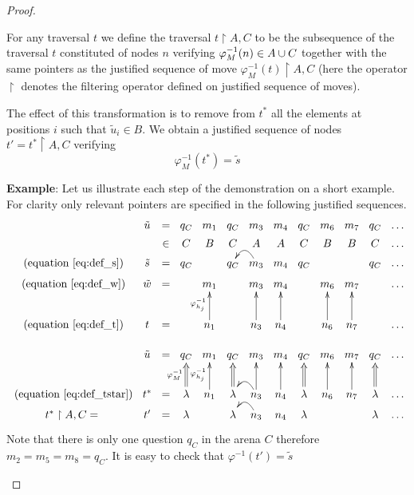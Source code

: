 \begin{proof}
\begin{itemize}
        For any traversal $t$ we define the traversal $t \upharpoonright A,C$
        to be the subsequence of the traversal $t$ constituted of nodes $n$
        verifying $\varphi^{-1}_M(n) \in A \cup C$ together with the same
        pointers as the justified sequence of move $\varphi^{-1}_M(t) \upharpoonright A,C$ (here the
        operator $\upharpoonright$ denotes the filtering operator
        defined on justified sequence of moves).

        The effect of this transformation is to  remove from $t^\ast$ all the elements at positions $i$ such that $\tilde{u}_i \in B$.
        We obtain a justified sequence of nodes $t' = t^\ast \upharpoonright A,C$
        verifying
            $$\varphi^{-1}_{M}(t^\ast) = \tilde{s}$$


        \textbf{Example}: Let us illustrate each step of the demonstration on a short example.
         For clarity only relevant pointers are specified in the following justified sequences.
        $$
        \xymatrix @=3pt{
          & \tilde{u} &=& q_C & m_1 & q_C & m_3 & m_4 & q_C & m_6 & m_7 & q_C & \ldots \\
          & &\in& C & B & C & A & A & C & B & B & C & \ldots \\
          \mbox{ (equation \ref{eq:def_s})} & \tilde{s} &=& q_C & & q_C & m_3  \ar@/_1pc/[l] & m_4 & q_C &  & & q_C & \ldots \\
          \mbox{ (equation \ref{eq:def_w})} & \tilde{w}  &=&  & m_1 &  & m_3 & m_4 &  & m_6 & m_7 &  & \ldots  \\ \\ \\
          \mbox{ (equation \ref{eq:def_t})} & t &=&  & n_1\ar[uuu]^{\varphi^{-1}_{h_j}} &  & n_3 \ar[uuu] & n_4\ar[uuu] & & n_6\ar[uuu] & n_7\ar[uuu] &  & \ldots \\ \\
           & \tilde{u}  &=& q_C & m_1 & q_C & m_3 & m_4 & q_C & m_6 & m_7 & q_C & \ldots  \\ \\ \\
          \mbox{ (equation \ref{eq:def_tstar})} & t^\ast &=& \lambda \ar@{=>}[uuu]^{\varphi^{-1}_{M}} & n_1\ar[uuu]^{\varphi^{-1}_{h_j}} & \lambda\ar@{=>}[uuu] & n_3 \ar[uuu] \ar@/_1pc/[l] & n_4\ar[uuu] & \lambda\ar@{=>}[uuu] & n_6\ar[uuu] & n_7\ar[uuu] & \lambda\ar@{=>}[uuu] & \ldots \\
          t^\ast\upharpoonright A,C =& t' &=& \lambda &  & \lambda & n_3\ar@/_1pc/[l] & n_4 & \lambda & &  & \lambda & \ldots \\
          }
        $$
        Note that there is only one question $q_C$ in the arena $C$ therefore $m_2 = m_5 = m_8 = q_C$.
        It is easy to check that $\varphi^{-1}(t') = \tilde{s}$



\end{itemize}
\end{proof}
